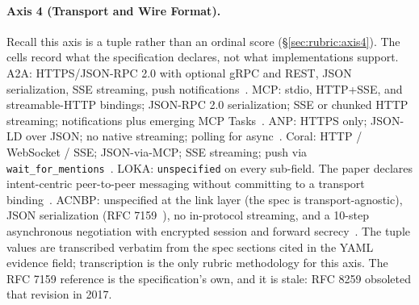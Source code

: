 \paragraph{Axis 4 (Transport and Wire Format).}
Recall this axis is a tuple rather than an ordinal score
(\S\ref{sec:rubric:axis4}). The cells record what the
specification declares, not what implementations support.
A2A: HTTPS/JSON-RPC 2.0 with optional gRPC and REST,
JSON serialization, SSE streaming, push
notifications~\cite{spec_a2a}. MCP: stdio, HTTP+SSE, and
streamable-HTTP bindings; JSON-RPC 2.0 serialization;
SSE or chunked HTTP streaming; notifications plus
emerging MCP Tasks~\cite{spec_mcp}. ANP: HTTPS only;
JSON-LD over JSON; no native streaming; polling for
async~\cite{spec_anp}. Coral: HTTP / WebSocket / SSE;
JSON-via-MCP; SSE streaming; push via
\texttt{wait\_for\_mentions}~\cite{spec_coral}. LOKA:
\texttt{unspecified} on every sub-field. The paper
declares intent-centric peer-to-peer messaging
without committing to a transport binding~\cite{spec_loka}.
ACNBP: unspecified at the link layer (the spec is
transport-agnostic), JSON serialization
(RFC 7159~\cite{rfc7159}), no
in-protocol streaming, and a 10-step asynchronous
negotiation with encrypted session and forward
secrecy~\cite{spec_acnbp}. The tuple values are
transcribed verbatim from the spec sections cited in
the YAML evidence field; transcription is the only
rubric methodology for this axis. The RFC 7159 reference
is the specification's own, and it is stale: RFC 8259
obsoleted that revision in 2017.

